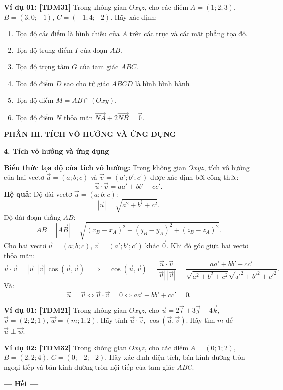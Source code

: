 \documentclass[12pt,a4paper]{article}
\newcommand{\partheading}[1]{\par\vspace{5pt}\noindent\textbf{\textcolor{sectionpurple}{#1}}\par\vspace{1pt}}
\newcommand{\example}[2][TDM21]{\par\vspace{3pt}\noindent\textbf{\textcolor{sectionpurple}{Ví dụ #2:} \textcolor{noteborder}{[#1]}}\enspace}
\newcommand{\tightitem}{\setlength{\itemsep}{1pt}\setlength{\topsep}{1pt}\setlength{\parsep}{0pt}\setlength{\partopsep}{0pt}}
\newcommand{\veczero}{\overrightarrow{0}}
\newcommand{\cvec}[1]{\overrightarrow{#1}}
\begin{document}
\begin{notebox}
\example[TDM31]{01} Trong không gian $Oxyz$, cho các điểm
$A=(1;2;3)$, $B=(3;0;-1)$, $C=(-1;4;-2)$. Hãy xác định:
\begin{enumerate}\tightitem
 \item Tọa độ các điểm là hình chiếu của $A$ trên các trục và các mặt phẳng tọa độ.
 \item Tọa độ trung điểm $I$ của đoạn $AB$.
 \item Tọa độ trọng tâm $G$ của tam giác $ABC$.
 \item Tọa độ điểm $D$ sao cho tứ giác $ABCD$ là hình bình hành.
 \item Tọa độ điểm $M=AB\cap(Oxy)$.
 \item Tọa độ điểm $N$ thỏa mãn $\cvec{NA}+2\cvec{NB}=\veczero$.
\end{enumerate}
\end{notebox}

\partheading{PHẦN III. TÍCH VÔ HƯỚNG VÀ ỨNG DỤNG}
\textbf{4. Tích vô hướng và ứng dụng}

\textbf{Biểu thức tọa độ của tích vô hướng:}
Trong không gian $Oxyz$, tích vô hướng của hai vectơ
$\vec u=(a;b;c)$ và $\vec v=(a';b';c')$ được xác định bởi công thức:
\[
 \vec u\cdot\vec v=aa'+bb'+cc'.
\]
\textbf{Hệ quả:} Độ dài vectơ $\vec u=(a;b;c)$:
\[
 |\vec u|=\sqrt{a^2+b^2+c^2}.
\]
Độ dài đoạn thẳng $AB$:
\[
 AB=|\cvec{AB}|=
 \sqrt{(x_B-x_A)^2+(y_B-y_A)^2+(z_B-z_A)^2}.
\]
Cho hai vectơ $\vec u=(a;b;c)$, $\vec v=(a';b';c')$ khác $\veczero$.
Khi đó góc giữa hai vectơ thỏa mãn:
\[
 \vec u\cdot\vec v=|\vec u|\,|\vec v|\,\cos(\vec u,\vec v)
 \quad\Rightarrow\quad
 \cos(\vec u,\vec v)=
 \frac{\vec u\cdot\vec v}{|\vec u|\,|\vec v|}
 =\frac{aa'+bb'+cc'}
 {\sqrt{a^2+b^2+c^2}\sqrt{a'^2+b'^2+c'^2}}.
\]
Và:
\[
 \vec u\perp\vec v
 \iff\vec u\cdot\vec v=0
 \iff aa'+bb'+cc'=0.
\]

\begin{notebox}
\example[TDM21]{01} Trong không gian $Oxyz$, cho
$\vec u=2\vec i+3\vec j-4\vec k$, $\vec v=(2;2;1)$, $\vec w=(m;1;2)$.
Hãy tính $\vec u\cdot\vec v$, $\cos(\vec u,\vec v)$.
Hãy tìm $m$ để $\vec u\perp\vec w$.
\end{notebox}

\begin{notebox}
\example[TDM32]{02} Trong không gian $Oxyz$, cho các điểm
$A=(0;1;2)$, $B=(2;2;4)$, $C=(0;-2;-2)$.
Hãy xác định diện tích, bán kính đường tròn ngoại tiếp và bán kính
đường tròn nội tiếp của tam giác $ABC$.
\end{notebox}

\begin{center}
\textbf{\textcolor{sectionpurple}{--- Hết ---}}
\end{center}
\end{document}
